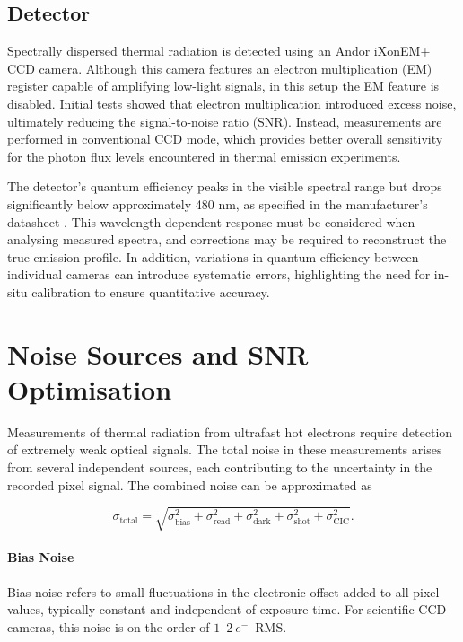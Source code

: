 \documentclass[
	parskip=half,
	a4paper,
]{scrarticle}
\begin{document}
\subsection{Detector}
Spectrally dispersed thermal radiation is detected using an Andor iXonEM+ CCD camera. Although this camera features an electron multiplication (EM) register capable of amplifying low-light signals, in this setup the EM feature is disabled. Initial tests showed that electron multiplication introduced excess noise, ultimately reducing the signal-to-noise ratio (SNR). Instead, measurements are performed in conventional CCD mode, which provides better overall sensitivity for the photon flux levels encountered in thermal emission experiments.

The detector's quantum efficiency peaks in the visible spectral range but drops significantly below approximately 480 nm, as specified in the manufacturer's datasheet \autocite{andor_andor_nodate}. This wavelength-dependent response must be considered when analysing measured spectra, and corrections may be required to reconstruct the true emission profile. In addition, variations in quantum efficiency between individual cameras can introduce systematic errors, highlighting the need for in-situ calibration to ensure quantitative accuracy.


\section{Noise Sources and SNR Optimisation}

Measurements of thermal radiation from ultrafast hot electrons require detection of extremely weak optical signals. The total noise in these measurements arises from several independent sources, each contributing to the uncertainty in the recorded pixel signal. The combined noise can be approximated as

\begin{equation}
    \sigma_{\text{total}} = \sqrt{\sigma_{\text{bias}}^2 + \sigma_{\text{read}}^2 + \sigma_{\text{dark}}^2 + \sigma_{\text{shot}}^2 + \sigma_{\text{CIC}}^2}.
\end{equation}

\paragraph{Bias Noise}

Bias noise refers to small fluctuations in the electronic offset added to all pixel values, typically constant and independent of exposure time. For scientific CCD cameras, this noise is on the order of $1$--$2~e^{-}$~RMS.
\end{document}
